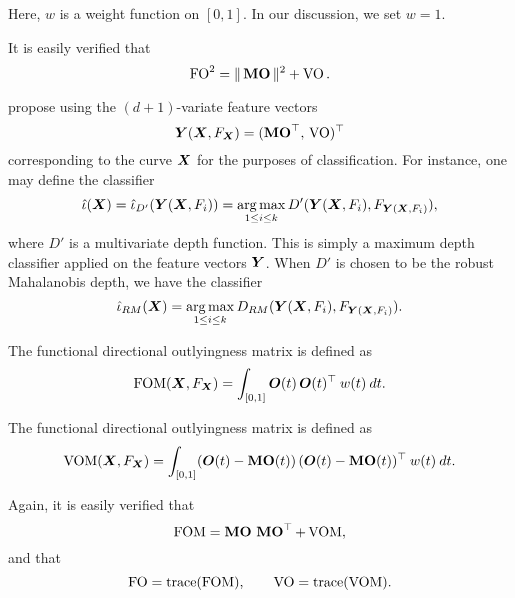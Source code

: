 Here, $w$ is a weight function on $[0, 1]$.
In our discussion, we set $w = 1$.

It is easily verified that
\begin{equation}
    \operatorname{FO}^2 = \Vert \operatorname{\textbf{MO}} \Vert^2 + \operatorname{VO}.
\end{equation}

\textcite{dai-genton-2018} propose using the $(d + 1)$-variate feature vectors
\begin{equation}
    \bm{Y}(\bm{X}, F_{\bm{X}}) = (\operatorname{\textbf{MO}}^\top,\, \operatorname{VO})^\top
\end{equation}
corresponding to the curve $\bm{X}$ for the purposes of classification.
For instance, one may define the classifier
\begin{equation}
    \hat{\iota}(\bm{X}) = \hat{\iota}_{D'}(\bm{Y}(\bm{X}, F_i)) = \operatorname*{arg\,max}_{1 \leq i \leq k} D'(\bm{Y}(\bm{X}, F_i), F_{\bm{Y}(\bm{X}, F_i)}),
\end{equation}
where $D'$ is a multivariate depth function.
This is simply a maximum depth classifier applied on the feature vectors
$\bm{Y}$.
When $D'$ is chosen to be the robust Mahalanobis depth, we have the classifier
\begin{equation}
    \hat{\iota}_{RM}(\bm{X}) = \operatorname*{arg\,max}_{1 \leq i \leq k} D_{RM}(\bm{Y}(\bm{X}, F_i), F_{\bm{Y}(\bm{X}, F_i)}).
\end{equation}



\begin{definition}
    The functional directional outlyingness matrix is defined as
    \begin{equation}
        \operatorname{FOM}(\bm{X}, F_{\bm{X}}) = \int_{[0, 1]} \bm{O}(t)\,\bm{O}(t)^\top \:w(t)\:dt.
    \end{equation}
\end{definition}

\begin{definition}
    The functional directional outlyingness matrix is defined as
    \begin{equation}
        \operatorname{VOM}(\bm{X}, F_{\bm{X}}) = \int_{[0, 1]} (\bm{O}(t) - \operatorname{\textbf{MO}}(t))\,(\bm{O}(t) - \operatorname{\textbf{MO}}(t))^\top \:w(t)\:dt.
    \end{equation}
\end{definition}

Again, it is easily verified that
\begin{equation}
    \operatorname{FOM} = \operatorname{\textbf{MO}}\,\operatorname{\textbf{MO}}^\top + \operatorname{VOM},
\end{equation}
and that
\begin{equation}
    \operatorname{FO} = \operatorname{trace}(\operatorname{FOM}), \qquad
    \operatorname{VO} = \operatorname{trace}(\operatorname{VOM}).
\end{equation}


